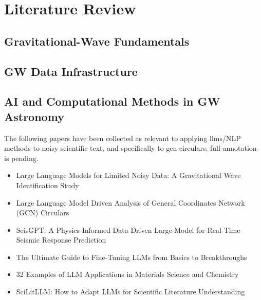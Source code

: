 \chapter{Literature Review}
\label{ch:literature}


\section{Gravitational-Wave Fundamentals}


\section{GW Data Infrastructure}


\section{AI and Computational Methods in GW Astronomy}

The following papers have been collected as relevant to applying \glspl{llm}/NLP methods to noisy scientific text, and specifically to \gls{gcn} circulars; full annotation is pending.

\begin{itemize}
    \item Large Language Models for Limited Noisy Data: A Gravitational Wave Identification Study
    \item Large Language Model Driven Analysis of General Coordinates Network (GCN) Circulars
    \item SeisGPT: A Physics-Informed Data-Driven Large Model for Real-Time Seismic Response Prediction
    \item The Ultimate Guide to Fine-Tuning LLMs from Basics to Breakthroughs
    \item 32 Examples of LLM Applications in Materials Science and Chemistry
    \item SciLitLLM: How to Adapt LLMs for Scientific Literature Understanding
\end{itemize}

